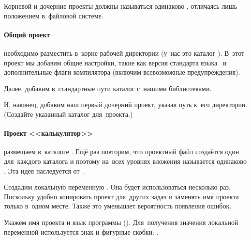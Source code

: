 Корневой и дочерние проекты  должны называться одинаково , отличаясь лишь положением в~файловой системе.



\paragraph{Общий проект}
необходимо разместить в~корне рабочей директории (у~нас это каталог ). В~этот проект мы добавим общие настройки, такие как версия стандарта языка~ и дополнительные флаги компилятора (включим всевозможные предупреждения).


Далее, добавим в~стандартные пути каталог с~нашими библиотеками.


И, наконец, добавим наш первый дочерний проект, указав путь к~его директории. (Создайте указанный каталог для~проекта.)




\paragraph{Проект <<калькулятор>>}\label{sect:calcproj}
размещаем в~каталоге . Ещё раз повторим, что проектный файл создаётся один для~каждого каталога и поэтому на~всех уровнях вложения называется одинаково . Эта идея наследуется от~.

Создадим локальную переменную . Она будет использоваться несколько раз. Поскольку удобно копировать проект для~других задач и заменять имя проекта только в~одном месте. Также это уменьшает вероятность появления ошибок.


Укажем имя проекта и язык программы (). Для~получения значения локальной переменной используется знак \code{\$} и фигурные скобки: .


